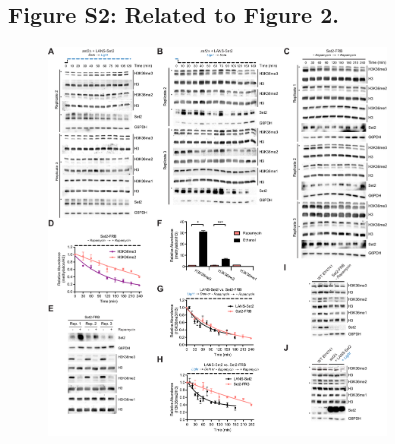 \documentclass[11pt]{biorxiv}
\begin{document}
\subsection{Figure S2: Related to Figure 2.}
\begin{figure}[ht!]
\center
\includegraphics[width=0.8\textwidth, trim={0in 0in 0in 0in}, clip]{figures/FigS2_reduced2.pdf}
\end{figure}
\end{document}
